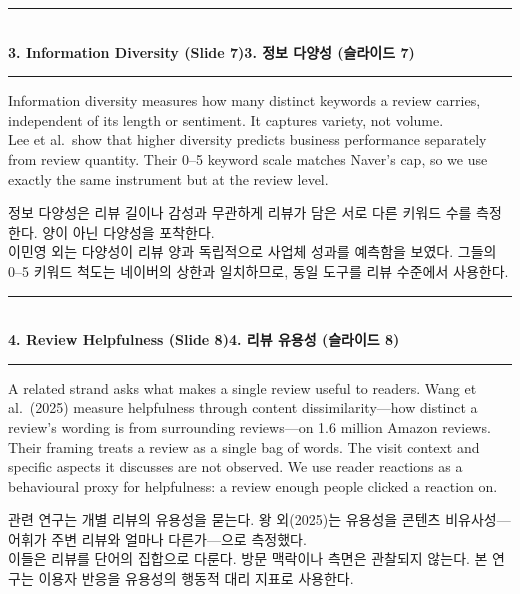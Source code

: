\documentclass[10pt,a4paper]{article}
\newcommand{\sechead}[2]{%
  \vspace{6pt}%
  \noindent\rule{\linewidth}{0.6pt}\\[1pt]
  {\small\bfseries #1\hfill #2}\\[-3pt]
  \rule{\linewidth}{0.4pt}\par\vspace{2pt}%
}
\newcommand{\sent}[1]{#1\\[5pt]}
\newcommand{\bilingual}[2]{%
  \noindent%
  \begin{minipage}[t]{0.485\linewidth}
    \small #1
  \end{minipage}\hfill\vrule\hfill%
  \begin{minipage}[t]{0.483\linewidth}
    \small #2
  \end{minipage}\par\vspace{4pt}%
}
\begin{document}
\sechead{3. Information Diversity (Slide 7)}{3. 정보 다양성 (슬라이드 7)}
\bilingual{%
  \sent{Information diversity measures how many distinct keywords a review carries, independent of its length or sentiment. It captures variety, not volume.}
  \sent{Lee et al.\ show that higher diversity predicts business performance separately from review quantity. Their 0--5 keyword scale matches Naver's cap, so we use exactly the same instrument but at the review level.}
}{%
  \sent{정보 다양성은 리뷰 길이나 감성과 무관하게 리뷰가 담은 서로 다른 키워드 수를 측정한다. 양이 아닌 다양성을 포착한다.}
  \sent{이민영 외는 다양성이 리뷰 양과 독립적으로 사업체 성과를 예측함을 보였다. 그들의 0--5 키워드 척도는 네이버의 상한과 일치하므로, 동일 도구를 리뷰 수준에서 사용한다.}
}

\sechead{4. Review Helpfulness (Slide 8)}{4. 리뷰 유용성 (슬라이드 8)}
\bilingual{%
  \sent{A related strand asks what makes a single review useful to readers. Wang et al.\ (2025) measure helpfulness through content dissimilarity---how distinct a review's wording is from surrounding reviews---on 1.6 million Amazon reviews.}
  \sent{Their framing treats a review as a single bag of words. The visit context and specific aspects it discusses are not observed. We use reader reactions as a behavioural proxy for helpfulness: a review enough people clicked a reaction on.}
}{%
  \sent{관련 연구는 개별 리뷰의 유용성을 묻는다. 왕 외(2025)는 유용성을 콘텐츠 비유사성---어휘가 주변 리뷰와 얼마나 다른가---으로 측정했다.}
  \sent{이들은 리뷰를 단어의 집합으로 다룬다. 방문 맥락이나 측면은 관찰되지 않는다. 본 연구는 이용자 반응을 유용성의 행동적 대리 지표로 사용한다.}
}
\end{document}
